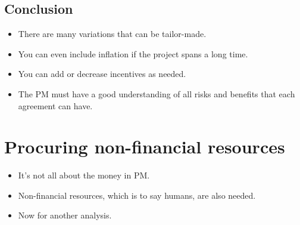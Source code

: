 \subsection{Conclusion}
\begin{itemize}
    \item There are many variations that can be tailor-made.
    \item You can even include inflation if the project spans a long time.
    \item You can add or decrease incentives as needed.
    \item The PM must have a good understanding of all risks and benefits that each agreement can have. 
\end{itemize}

\section{Procuring non-financial resources}
\begin{itemize}
    \item It's not all about the money in PM.
    \item Non-financial resources, which is to say humans, are also needed.
    \item Now for another analysis.
\end{itemize}

